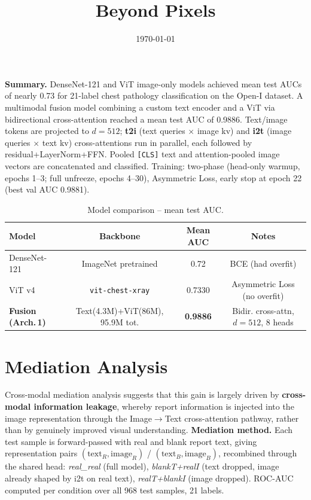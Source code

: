 \documentclass[10pt]{article}
\title{\large Beyond Pixels}
\date{\vspace{-1.5em}\small\today}
\begin{document}
\maketitle
\vspace{-1.5em}

\noindent\footnotesize
\textbf{Summary.} DenseNet-121 and ViT image-only models achieved mean test AUCs of nearly 0.73 for 21-label chest pathology classification on the Open-I
dataset. A multimodal fusion model combining a custom text encoder and a ViT via
bidirectional cross-attention reached a mean test AUC of 0.9886. 
Text/image tokens are projected to $d{=}512$; \textbf{t2i} (text queries $\times$
image kv) and \textbf{i2t} (image queries $\times$ text kv) cross-attentions run
in parallel, each followed by residual+LayerNorm+FFN. Pooled \texttt{[CLS]} text
and attention-pooled image vectors are concatenated and classified. Training:
two-phase (head-only warmup, epochs 1--3; full unfreeze, epochs 4--30), Asymmetric
Loss, early stop at epoch 22 (best val AUC 0.9881).



\vspace{2pt}
\begin{table}[H]
\centering\footnotesize
\caption{Model comparison -- mean test AUC.}
\begin{tabular}{lccc}
\toprule
Model & Backbone & Mean AUC & Notes \\
\midrule
DenseNet-121 & ImageNet pretrained & 0.72 & BCE (had overfit) \\
ViT v4 & \texttt{vit-chest-xray} & 0.7330 & Asymmetric Loss (no overfit) \\
\textbf{Fusion (Arch.\,1)} & Text(4.3M)+ViT(86M), 95.9M tot. & \textbf{0.9886} & Bidir. cross-attn, $d{=}512$, 8 heads \\
\bottomrule
\end{tabular}
\end{table}

\vspace{-4pt}
\section{Mediation Analysis}

Cross-modal mediation analysis suggests that this gain is largely driven by
\textbf{cross-modal information leakage}, whereby report information is injected
into the image representation through the Image$\rightarrow$Text cross-attention
pathway, rather than by genuinely improved visual understanding.
\textbf{Mediation method.} Each test sample is forward-passed with real and blank
report text, giving representation pairs
$(\text{text}_R,\text{image}_R)$ / $(\text{text}_B,\text{image}_B)$, recombined
through the shared head: \textit{real\_real} (full model), \textit{blankT+realI}
(text dropped, image already shaped by i2t on real text), \textit{realT+blankI}
(image dropped). ROC-AUC computed per condition over all 968 test samples, 21 labels.
\end{document}
